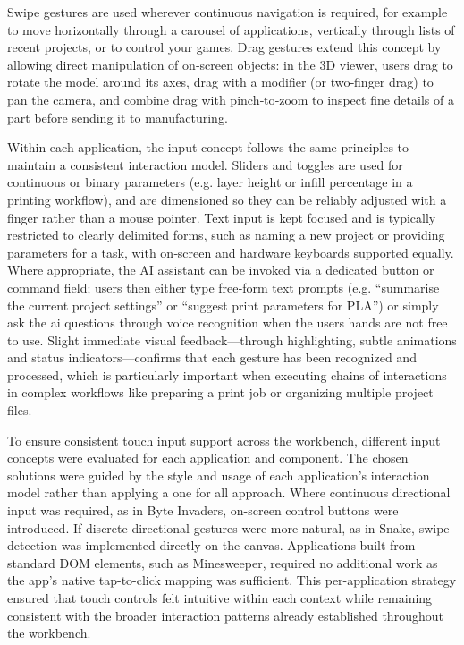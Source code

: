 \documentclass[a4paper,12pt]{article}
\begin{document}
Swipe gestures are used wherever continuous navigation is required, for example to move horizontally through a carousel of applications, vertically through lists of recent projects, or to control your games.  Drag gestures extend this concept by allowing direct manipulation of on‑screen objects: in the 3D viewer, users drag to rotate the model around its axes, drag with a modifier (or two‑finger drag) to pan the camera, and combine drag with pinch‑to‑zoom to inspect fine details of a part before sending it to manufacturing.  

Within each application, the input concept follows the same principles to maintain a consistent interaction model. Sliders and toggles are used for continuous or binary parameters (e.g. layer height or infill percentage in a printing workflow), and are dimensioned so they can be reliably adjusted with a finger rather than a mouse pointer. Text input is kept focused and is typically restricted to clearly delimited forms, such as naming a new project or providing parameters for a task, with on‑screen and hardware keyboards supported equally. Where appropriate, the AI assistant can be invoked via a dedicated button or command field; users then either type free‑form text prompts (e.g. “summarise the current project settings” or “suggest print parameters for PLA”) or simply ask the ai questions through voice recognition when the users hands are not free to use. Slight immediate visual feedback—through highlighting, subtle animations and status indicators—confirms that each gesture has been recognized and processed, which is particularly important when executing chains of interactions in complex workflows like preparing a print job or organizing multiple project files.

To ensure consistent touch input support across the workbench, different input concepts were evaluated for each application and component. The chosen solutions were guided by the style and usage of each application's interaction model rather than applying a one for all approach. Where continuous directional input was required, as in Byte Invaders, on-screen control buttons were introduced. If discrete directional gestures were more natural, as in Snake, swipe detection was implemented directly on the canvas. Applications built from standard DOM elements, such as Minesweeper, required no additional work as the app's native tap-to-click mapping was sufficient. This per-application strategy ensured that touch controls felt intuitive within each context while remaining consistent with the broader interaction patterns already established throughout the workbench.
\end{document}
